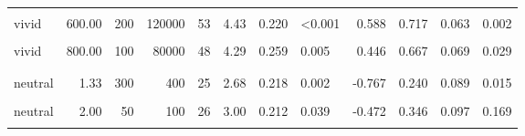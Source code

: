 \documentclass[
]{article}
\begin{document}
\begin{longtable}[t]{lrrrrrrlrrrl}
\hspace{1em}\cellcolor{gray!10}{vivid} & \cellcolor{gray!10}{600.00} & \cellcolor{gray!10}{20} & \cellcolor{gray!10}{12000} & \cellcolor{gray!10}{49} & \cellcolor{gray!10}{4.04} & \cellcolor{gray!10}{0.257} & \cellcolor{gray!10}{0.047} & \cellcolor{gray!10}{0.304} & \cellcolor{gray!10}{0.633} & \cellcolor{gray!10}{0.070} & \cellcolor{gray!10}{0.085}\\
\hspace{1em}vivid & 600.00 & 200 & 120000 & 53 & 4.43 & 0.220 & <0.001 & 0.588 & 0.717 & 0.063 & 0.002\\
\hspace{1em}\cellcolor{gray!10}{vivid} & \cellcolor{gray!10}{800.00} & \cellcolor{gray!10}{30} & \cellcolor{gray!10}{24000} & \cellcolor{gray!10}{53} & \cellcolor{gray!10}{4.58} & \cellcolor{gray!10}{0.202} & \cellcolor{gray!10}{<0.001} & \cellcolor{gray!10}{0.743} & \cellcolor{gray!10}{0.849} & \cellcolor{gray!10}{0.050} & \cellcolor{gray!10}{<0.001}\\
\hspace{1em}vivid & 800.00 & 100 & 80000 & 48 & 4.29 & 0.259 & 0.005 & 0.446 & 0.667 & 0.069 & 0.029\\
\addlinespace[0.3em]
\multicolumn{12}{l}{\textbf{Exp. 4 (filtered)}}\\
\hspace{1em}\cellcolor{gray!10}{neutral} & \cellcolor{gray!10}{1.33} & \cellcolor{gray!10}{30} & \cellcolor{gray!10}{40} & \cellcolor{gray!10}{26} & \cellcolor{gray!10}{2.04} & \cellcolor{gray!10}{0.230} & \cellcolor{gray!10}{<0.001} & \cellcolor{gray!10}{-1.273} & \cellcolor{gray!10}{0.115} & \cellcolor{gray!10}{0.065} & \cellcolor{gray!10}{<0.001}\\
\hspace{1em}neutral & 1.33 & 300 & 400 & 25 & 2.68 & 0.218 & 0.002 & -0.767 & 0.240 & 0.089 & 0.015\\
\hspace{1em}\cellcolor{gray!10}{neutral} & \cellcolor{gray!10}{2.00} & \cellcolor{gray!10}{20} & \cellcolor{gray!10}{40} & \cellcolor{gray!10}{26} & \cellcolor{gray!10}{3.12} & \cellcolor{gray!10}{0.249} & \cellcolor{gray!10}{0.290} & \cellcolor{gray!10}{-0.309} & \cellcolor{gray!10}{0.462} & \cellcolor{gray!10}{0.102} & \cellcolor{gray!10}{0.845}\\
\hspace{1em}neutral & 2.00 & 50 & 100 & 26 & 3.00 & 0.212 & 0.039 & -0.472 & 0.346 & 0.097 & 0.169\\
\hspace{1em}\cellcolor{gray!10}{neutral} & \cellcolor{gray!10}{3.00} & \cellcolor{gray!10}{10} & \cellcolor{gray!10}{30} & \cellcolor{gray!10}{27} & \cellcolor{gray!10}{3.44} & \cellcolor{gray!10}{0.263} & \cellcolor{gray!10}{0.961} & \cellcolor{gray!10}{-0.041} & \cellcolor{gray!10}{0.593} & \cellcolor{gray!10}{0.098} & \cellcolor{gray!10}{0.442}\\

\end{longtable}
\end{document}
